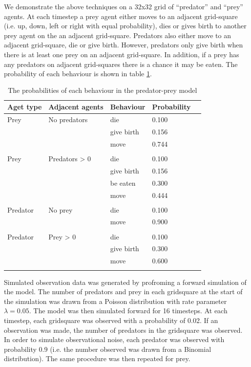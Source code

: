 \documentclass{article}
\begin{document}
We demonstrate the above techniques on a 32x32 grid of ``predator'' and ``prey'' agents. At each timestep a prey agent either moves to an adjacent grid-square (i.e. up, down, left or right with equal probability), dies or gives birth to another prey agent on the an adjacent grid-square. Predators also either move to an adjacent grid-square, die or give birth. However, predators only give birth when there is at least one prey on an adjacent grid-square. In addition, if a prey has any predators on adjacent grid-squares there is a chance it may be eaten. The probability of each behaviour is shown in table \ref{rates}.

\begin{table}
	\begin{center}
		\begin{tabular}{llllc}
		\hline
		Aget type & Adjacent agents & Behaviour & Probability\\
		\hline
		Prey & No predators & die &        0.100\\
			& & give birth &        0.156\\
			& & move &        0.744\\
			& &&\\
		Prey & Predators > 0 & die &        0.100\\
			& & give birth &        0.156\\
			& & be eaten &        0.300\\
			& & move &        0.444\\
			& &&\\
		Predator  & No prey & die  &      0.100\\
			& & move &        0.900\\
			& &&\\
		Predator  & Prey > 0 & die  &      0.100\\
			& & give birth &        0.300\\
			& & move &        0.600\\
		\hline& 
		\end{tabular}
	\end{center}
	\caption{The probabilities of each behaviour in the predator-prey model}
	\label{rates}
\end{table}

Simulated observation data was generated by profroming a forward simulation of the model. The number of predators and prey in each gridsquare at the start of the simulation was drawn from a Poisson distribution with rate parameter $\lambda = 0.05$. The model was then simulated forward for 16 timesteps. At each timestep, each gridsquare was observed with a probability of 0.02. If an observation was made, the number of predators in the gridsquare was observed. In order to simulate observational noise, each predator was observed with probability 0.9 (i.e. the number observed was drawn from a Binomial distribution). The same procedure was then repeated for prey.
\end{document}
